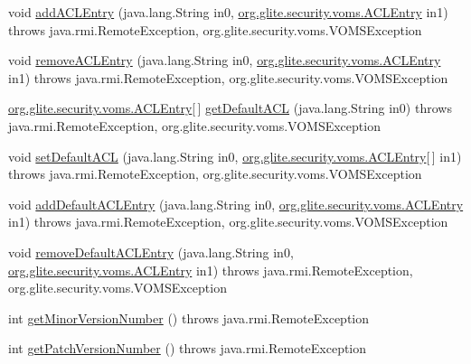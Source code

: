 \begin{DoxyCompactItemize}
\item 
void \hyperlink{interfaceorg_1_1glite_1_1security_1_1voms_1_1service_1_1admin_1_1VOMSAdmin_ad65f31d3eadcbe2a63081a370ada5a5e}{addACLEntry} (java.lang.String in0, \hyperlink{classorg_1_1glite_1_1security_1_1voms_1_1ACLEntry}{org.glite.security.voms.ACLEntry} in1)  throws java.rmi.RemoteException, org.glite.security.voms.VOMSException
\item 
void \hyperlink{interfaceorg_1_1glite_1_1security_1_1voms_1_1service_1_1admin_1_1VOMSAdmin_ae6dd61d2a72a363eaaca5cdf4fe02a6a}{removeACLEntry} (java.lang.String in0, \hyperlink{classorg_1_1glite_1_1security_1_1voms_1_1ACLEntry}{org.glite.security.voms.ACLEntry} in1)  throws java.rmi.RemoteException, org.glite.security.voms.VOMSException
\item 
\hyperlink{classorg_1_1glite_1_1security_1_1voms_1_1ACLEntry}{org.glite.security.voms.ACLEntry}\mbox{[}$\,$\mbox{]} \hyperlink{interfaceorg_1_1glite_1_1security_1_1voms_1_1service_1_1admin_1_1VOMSAdmin_a65a29f134cd5d06f01299d421d12d12f}{getDefaultACL} (java.lang.String in0)  throws java.rmi.RemoteException, org.glite.security.voms.VOMSException
\item 
void \hyperlink{interfaceorg_1_1glite_1_1security_1_1voms_1_1service_1_1admin_1_1VOMSAdmin_aa3745c4b47675e96b06baea7849f1376}{setDefaultACL} (java.lang.String in0, \hyperlink{classorg_1_1glite_1_1security_1_1voms_1_1ACLEntry}{org.glite.security.voms.ACLEntry}\mbox{[}$\,$\mbox{]} in1)  throws java.rmi.RemoteException, org.glite.security.voms.VOMSException
\item 
void \hyperlink{interfaceorg_1_1glite_1_1security_1_1voms_1_1service_1_1admin_1_1VOMSAdmin_aba8b9a0081029c3a803ddbb2860e059f}{addDefaultACLEntry} (java.lang.String in0, \hyperlink{classorg_1_1glite_1_1security_1_1voms_1_1ACLEntry}{org.glite.security.voms.ACLEntry} in1)  throws java.rmi.RemoteException, org.glite.security.voms.VOMSException
\item 
void \hyperlink{interfaceorg_1_1glite_1_1security_1_1voms_1_1service_1_1admin_1_1VOMSAdmin_a560d3fe21447e359f2a1010ce500afbd}{removeDefaultACLEntry} (java.lang.String in0, \hyperlink{classorg_1_1glite_1_1security_1_1voms_1_1ACLEntry}{org.glite.security.voms.ACLEntry} in1)  throws java.rmi.RemoteException, org.glite.security.voms.VOMSException
\item 
int \hyperlink{interfaceorg_1_1glite_1_1security_1_1voms_1_1service_1_1admin_1_1VOMSAdmin_aa8680387ae34fdf00209be2d9327abad}{getMinorVersionNumber} ()  throws java.rmi.RemoteException
\item 
int \hyperlink{interfaceorg_1_1glite_1_1security_1_1voms_1_1service_1_1admin_1_1VOMSAdmin_a1f02e6d57e0b68006f6f57bbdd9b451a}{getPatchVersionNumber} ()  throws java.rmi.RemoteException
\end{DoxyCompactItemize}



